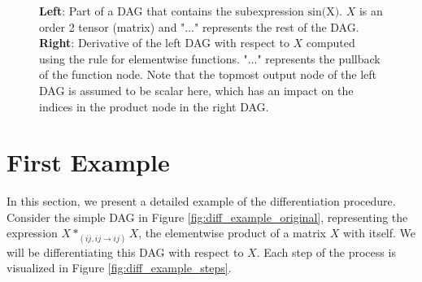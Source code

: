 \documentclass[12pt, a4paper]{report}
\begin{document}
\begin{figure}
    \centering
    \begin{minipage}{7cm}
        \centering
    \end{minipage}
    \begin{minipage}{7cm}
        \centering
    \end{minipage}
    \caption{\textbf{Left}: Part of a DAG that contains the subexpression $\text{sin(X)}$. $X$ is an order 2 tensor (matrix) and "..." represents the rest of the DAG. \textbf{Right}: Derivative of the left DAG with respect to $X$ computed using the rule for elementwise functions. "..." represents the pullback of the function node. Note that the topmost output node of the left DAG is assumed to be scalar here, which has an impact on the indices in the product node in the right DAG.}
    \label{fig:func_rule}
\end{figure}

\FloatBarrier
\section{First Example}
In this section, we present a detailed example of the differentiation procedure.
Consider the simple DAG in Figure \ref{fig:diff_example_original}, representing the expression $X *_{(ij,ij \rightarrow ij)} X$, the elementwise product of a matrix $X$ with itself.
We will be differentiating this DAG with respect to $X$.
Each step of the process is visualized in Figure \ref{fig:diff_example_steps}.
\end{document}
